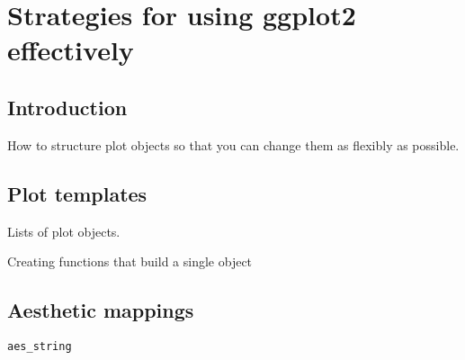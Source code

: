 

\chapter{Strategies for using ggplot2 effectively}
\section{Introduction}
\label{sec:introduction}

How to structure plot objects so that you can change them as flexibly as possible.

\section{Plot templates}
\label{sec:templates}

Lists of plot objects.

Creating functions that build a single object

\section{Aesthetic mappings}
\label{sec:aesthetic_mappings}

{\tt aes\_string}



